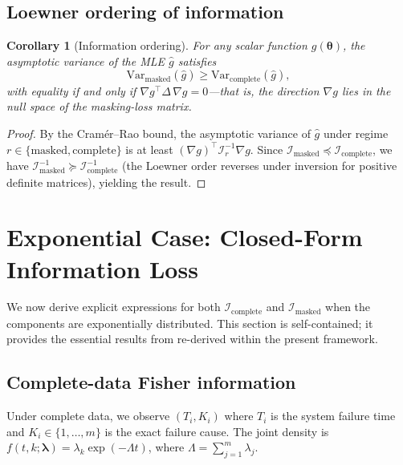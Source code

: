 \documentclass[11pt]{article}
\theoremstyle{definition}
\theoremstyle{plain}
\newtheorem{corollary}{Corollary}
\renewcommand{\v}[1]{\boldsymbol{#1}}
\newcommand{\btheta}{\v{\theta}}
\newcommand{\Var}{\mathrm{Var}}
\newcommand{\Loewner}{\preceq}
\newcommand{\FI}{\mathcal{I}}       %
\begin{document}
\subsection{Loewner ordering of information}

\begin{corollary}[Information ordering]
\label{cor:loewner-ordering}
For any scalar function $g(\btheta)$, the asymptotic variance of the
MLE $\hat{g}$ satisfies
\begin{equation}
    \Var_{\mathrm{masked}}(\hat{g})
    \geq \Var_{\mathrm{complete}}(\hat{g}),
\end{equation}
with equality if and only if
$\nabla g^\top \Delta \, \nabla g = 0$---that is, the direction
$\nabla g$ lies in the null space of the masking-loss matrix.
\end{corollary}

\begin{proof}
By the Cram\'er--Rao bound, the asymptotic variance of $\hat{g}$
under regime $r \in \{\text{masked}, \text{complete}\}$ is at least
$(\nabla g)^\top \FI_r^{-1} \nabla g$.
Since $\FI_{\mathrm{masked}} \Loewner \FI_{\mathrm{complete}}$,
we have $\FI_{\mathrm{masked}}^{-1} \succeq \FI_{\mathrm{complete}}^{-1}$
(the Loewner order reverses under inversion for positive definite
matrices), yielding the result.
\end{proof}


\section{Exponential Case: Closed-Form Information Loss}
\label{sec:expo-info}

We now derive explicit expressions for both $\FI_{\mathrm{complete}}$
and $\FI_{\mathrm{masked}}$ when the components are exponentially
distributed.
This section is self-contained; it provides the essential results
from \citet{towell2026exponential} re-derived within the present
framework.

\subsection{Complete-data Fisher information}

Under complete data, we observe $(T_i, K_i)$ where $T_i$ is the
system failure time and $K_i \in \{1, \ldots, m\}$ is the exact
failure cause.
The joint density is
$f(t, k; \v{\lambda}) = \lambda_k \exp(-\Lambda t)$,
where $\Lambda = \sum_{j=1}^m \lambda_j$.
\end{document}
